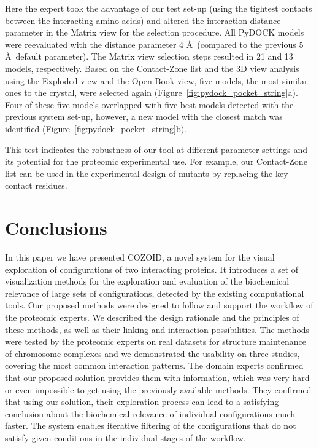 \documentclass{bmcart}
\def\OpBook {Open-Book view\xspace}
\def\ExpView {Exploded view\xspace}
\def\MatView {Matrix view\xspace}
\def\CoZoList{Contact-Zone list\xspace}
\begin{document}
Here the expert took the advantage of our test set-up (using the tightest contacts between the interacting amino acids) and altered the interaction distance parameter in the \MatView for the selection procedure. 
All PyDOCK models were reevaluated with the distance parameter 4 \AA~(compared to the previous 5 \AA~default parameter). 
The \MatView selection steps resulted in 21 and 13 models, respectively. 
Based on the \CoZoList and the 3D view analysis using the \ExpView and the \OpBook, five models, the most similar ones to the crystal, were selected again (Figure~\ref{fig:pydock_pocket_string}a). 
Four of these five models overlapped with five best models detected with the previous system set-up, however, a new model with the closest match was identified (Figure~\ref{fig:pydock_pocket_string}b).

This test indicates the robustness of our tool at different parameter settings and its potential for the proteomic experimental use. 
For example, our \CoZoList can be used in the experimental design of mutants by replacing the key contact residues. 

\section*{Conclusions}
In this paper we have presented COZOID, a novel system for the visual exploration of configurations of two interacting proteins. 
It introduces a set of visualization methods for the exploration and evaluation of the biochemical relevance of large sets of configurations, detected by the existing computational tools.
Our proposed methods were designed to follow and support the workflow of the proteomic experts.
We described the design rationale and the principles of these methods, as well as their linking and interaction possibilities. 
The methods were tested by the proteomic experts on real datasets for structure maintenance of chromosome complexes and we demonstrated the usability on three studies, covering the most common interaction patterns.
The domain experts confirmed that our proposed solution provides them with information, which was very hard or even impossible to get using the previously available methods.
They confirmed that using our solution, their exploration process can lead to a satisfying conclusion about the biochemical relevance of individual configurations much faster.
The system enables iterative filtering of the configurations that do not satisfy given conditions in the individual stages of the workflow.
\end{document}
